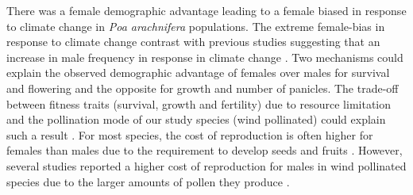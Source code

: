 \documentclass[12pt]{article}\usepackage[]{graphicx}\usepackage[dvipsnames]{xcolor}
\begin{document}
There was a female demographic advantage leading to a female biased in response to climate change in \emph{Poa arachnifera} populations.
The extreme female-bias in response to climate change contrast with  previous studies suggesting that an increase in male frequency in response in climate change \citep{petry2016sex,hultine2016climate}.
Two mechanisms could explain the observed demographic advantage of females over males for survival and flowering and the opposite for growth and number of panicles.
The trade-off between fitness traits (survival, growth and fertility) due to resource limitation and the pollination mode of our study species (wind pollinated) could explain such a result \citep{cipollini1994sexual,freeman1976differential}.
For most species, the cost of reproduction is often higher for females than males due to the requirement to develop seeds and fruits \citep{hultine2016climate}. 
However, several studies reported a higher cost of reproduction for males in wind pollinated species due to the larger amounts of pollen they produce \citep{burli2022environmental,cipollini1994sexual,bruijning2017surviving,field2013comparative}.
\end{document}
